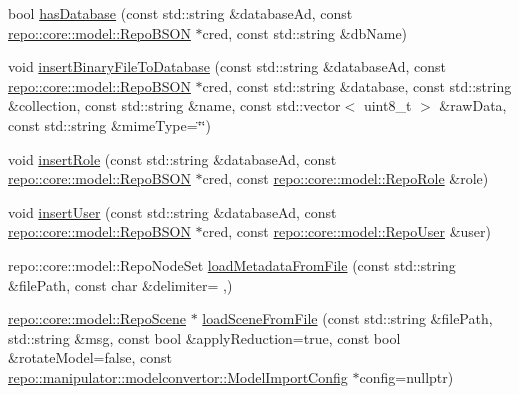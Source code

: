 \begin{DoxyCompactItemize}
\item 
bool \hyperlink{classrepo_1_1manipulator_1_1_repo_manipulator_ac090e9012cc803711efc1e3f35ab440a}{has\+Database} (const std\+::string \&database\+Ad, const \hyperlink{classrepo_1_1core_1_1model_1_1_repo_b_s_o_n}{repo\+::core\+::model\+::\+Repo\+B\+S\+O\+N} $\ast$cred, const std\+::string \&db\+Name)
\item 
void \hyperlink{classrepo_1_1manipulator_1_1_repo_manipulator_a84615f299d0e24aea6b6677d8de28311}{insert\+Binary\+File\+To\+Database} (const std\+::string \&database\+Ad, const \hyperlink{classrepo_1_1core_1_1model_1_1_repo_b_s_o_n}{repo\+::core\+::model\+::\+Repo\+B\+S\+O\+N} $\ast$cred, const std\+::string \&database, const std\+::string \&collection, const std\+::string \&name, const std\+::vector$<$ uint8\+\_\+t $>$ \&raw\+Data, const std\+::string \&mime\+Type=\char`\"{}\char`\"{})
\item 
void \hyperlink{classrepo_1_1manipulator_1_1_repo_manipulator_ad71033c3f687ec6641e0670807f6dc9c}{insert\+Role} (const std\+::string \&database\+Ad, const \hyperlink{classrepo_1_1core_1_1model_1_1_repo_b_s_o_n}{repo\+::core\+::model\+::\+Repo\+B\+S\+O\+N} $\ast$cred, const \hyperlink{classrepo_1_1core_1_1model_1_1_repo_role}{repo\+::core\+::model\+::\+Repo\+Role} \&role)
\item 
void \hyperlink{classrepo_1_1manipulator_1_1_repo_manipulator_a554161b98fa956eecf336e90b54055b8}{insert\+User} (const std\+::string \&database\+Ad, const \hyperlink{classrepo_1_1core_1_1model_1_1_repo_b_s_o_n}{repo\+::core\+::model\+::\+Repo\+B\+S\+O\+N} $\ast$cred, const \hyperlink{classrepo_1_1core_1_1model_1_1_repo_user}{repo\+::core\+::model\+::\+Repo\+User} \&user)
\item 
repo\+::core\+::model\+::\+Repo\+Node\+Set \hyperlink{classrepo_1_1manipulator_1_1_repo_manipulator_ac8aa3dc193f99717777016107f9f9e48}{load\+Metadata\+From\+File} (const std\+::string \&file\+Path, const char \&delimiter= \textquotesingle{},\textquotesingle{})
\item 
\hyperlink{classrepo_1_1core_1_1model_1_1_repo_scene}{repo\+::core\+::model\+::\+Repo\+Scene} $\ast$ \hyperlink{classrepo_1_1manipulator_1_1_repo_manipulator_a3084292164f952c449ba32ee38877dc3}{load\+Scene\+From\+File} (const std\+::string \&file\+Path, std\+::string \&msg, const bool \&apply\+Reduction=true, const bool \&rotate\+Model=false, const \hyperlink{classrepo_1_1manipulator_1_1modelconvertor_1_1_model_import_config}{repo\+::manipulator\+::modelconvertor\+::\+Model\+Import\+Config} $\ast$config=nullptr)
\item 

\end{DoxyCompactItemize}

